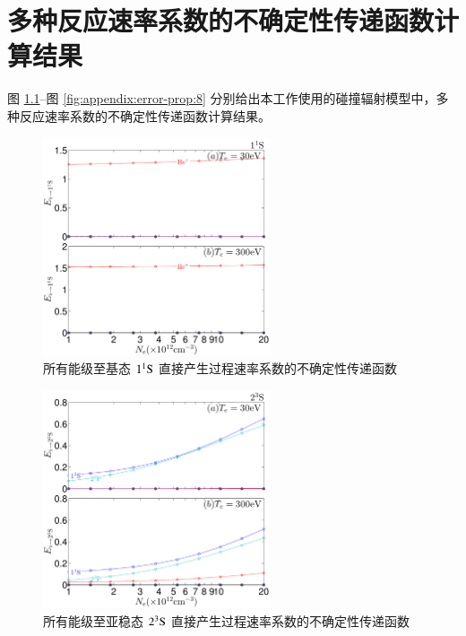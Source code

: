 \graphicspath{{figures/appendix-error-propgate/}}

\chapter{多种反应速率系数的不确定性传递函数计算结果}
\label{appendix:error-propagate}

图 \ref{fig:appendix:error-prop:1}--图 \ref{fig:appendix:error-prop:8} 分别给出本工作使用的碰撞辐射模型中，多种反应速率系数的不确定性传递函数计算结果。

\begin{figure}[H]
    \centering
    \includegraphics[width=0.6\textwidth]{11S-error-propagation-coefficient.pdf}
    \caption{所有能级至基态 $1^1{\rm S}$ 直接产生过程速率系数的不确定性传递函数}
    \label{fig:appendix:error-prop:1}
\end{figure}

\begin{figure}[H]
    \centering
    \includegraphics[width=0.6\textwidth]{23S-error-propagation-coefficient.pdf}
    \caption{所有能级至亚稳态 $2^3{\rm S}$ 直接产生过程速率系数的不确定性传递函数}
    \label{fig:appendix:error-prop:2}
\end{figure}

